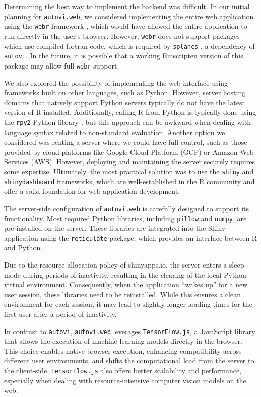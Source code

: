 \documentclass[
doublespace,
  times]{anzsauth}
\begin{document}
Determining the best way to implement the backend was difficult. In our
initial planning for \texttt{autovi.web}, we considered implementing the
entire web application using the \texttt{webr} framework \citep{webr},
which would have allowed the entire application to run directly in the
user's browser. However, \texttt{webr} does not support packages which
use compiled fortran code, which is required by \texttt{splancs}
\citep{splancs}, a dependency of \texttt{autovi}. In the future, it is
possible that a working Emscripten \citep{zakai2011emscripten} version
of this package may allow full \texttt{webr} support.

We also explored the possibility of implementing the web interface using
frameworks built on other languages, such as Python. However, server
hosting domains that natively support Python servers typically do not
have the latest version of R installed. Additionally, calling R from
Python is typically done using the \texttt{rpy2} Python library
\citep{rpy2}, but this approach can be awkward when dealing with
language syntax related to non-standard evaluation. Another option we
considered was renting a server where we could have full control, such
as those provided by cloud platforms like Google Cloud Platform (GCP) or
Amazon Web Services (AWS). However, deploying and maintaining the server
securely requires some expertise. Ultimately, the most practical
solution was to use the \texttt{shiny} and \texttt{shinydashboard}
frameworks, which are well-established in the R community and offer a
solid foundation for web application development.

The server-side configuration of \texttt{autovi.web} is carefully
designed to support its functionality. Most required Python libraries,
including \texttt{pillow} and \texttt{numpy}, are pre-installed on the
server. These libraries are integrated into the Shiny application using
the \texttt{reticulate} package, which provides an interface between R
and Python.

Due to the resource allocation policy of shinyapps.io, the server enters
a sleep mode during periods of inactivity, resulting in the clearing of
the local Python virtual environment. Consequently, when the application
``wakes up'' for a new user session, these libraries need to be
reinstalled. While this ensures a clean environment for each session, it
may lead to slightly longer loading times for the first user after a
period of inactivity.

In contrast to \texttt{autovi}, \texttt{autovi.web} leverages
\texttt{TensorFlow.js}, a JavaScript library that allows the execution
of machine learning models directly in the browser. This choice enables
native browser execution, enhancing compatibility across different user
environments, and shifts the computational load from the server to the
client-side. \texttt{TensorFlow.js} also offers better scalability and
performance, especially when dealing with resource-intensive computer
vision models on the web.
\end{document}
